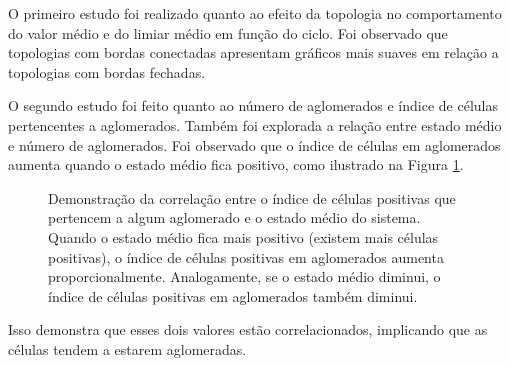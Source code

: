 \documentclass[
	12pt,				%
	openright,			%
	twoside,			%
	a4paper,			%
	english,			%
	french,				%
	spanish,			%
	brazil				%
	]{abntex2}
\begin{document}
O primeiro estudo foi realizado quanto ao efeito da topologia no comportamento do valor médio e do limiar médio em função do ciclo. Foi observado que topologias com bordas conectadas apresentam gráficos mais suaves em relação a topologias com bordas fechadas. %

%

O segundo estudo foi feito quanto ao número de aglomerados e índice de células pertencentes a aglomerados. Também foi explorada a relação entre estado médio e número de aglomerados. Foi observado que o índice de células em aglomerados aumenta quando o estado médio fica positivo, como ilustrado na Figura \ref{fig:dataL2000Q100CellInClusterAvgStateVsCycle}. 
\begin{figure}[h]
    \centering
    \caption{Demonstração da correlação entre o índice de células positivas que pertencem a algum aglomerado e o estado médio do sistema. Quando o estado médio fica mais positivo (existem mais células positivas), o índice de células positivas em aglomerados aumenta proporcionalmente. Analogamente, se o estado médio diminui, o índice de células positivas em aglomerados também diminui.}
    \label{fig:dataL2000Q100CellInClusterAvgStateVsCycle}
\end{figure}
Isso demonstra que esses dois valores estão correlacionados, implicando que as células tendem a estarem aglomeradas. 
\end{document}
